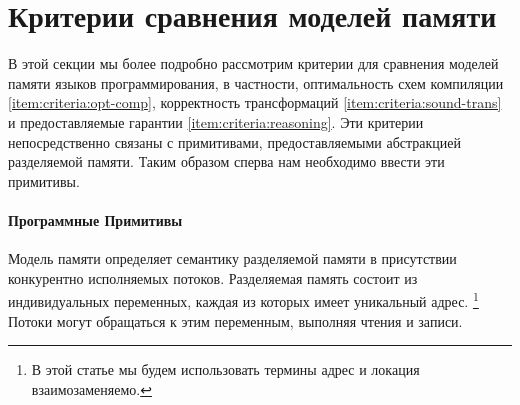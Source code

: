 \section{Критерии сравнения моделей памяти}
\label{sec:background}

В этой секции мы более подробно рассмотрим 
критерии для сравнения моделей памяти языков программирования,
в частности, оптимальность схем компиляции \ref{item:criteria:opt-comp},
корректность трансформаций \ref{item:criteria:sound-trans}
и предоставляемые гарантии \ref{item:criteria:reasoning}.
Эти критерии непосредственно связаны с примитивами, 
предоставляемыми абстракцией разделяемой памяти. 
Таким образом сперва нам необходимо ввести эти примитивы. 

\paragraph{Программные Примитивы}
\label{sec:background:primitives}

Модель памяти определяет семантику разделяемой памяти
в присутствии конкурентно исполняемых потоков. 
Разделяемая память состоит из индивидуальных переменных, 
каждая из которых имеет уникальный адрес.%
\footnote{В этой статье мы будем использовать 
термины адрес и локация взаимозаменяемо.}
Потоки могут обращаться к этим переменным, 
выполняя чтения и записи. 

